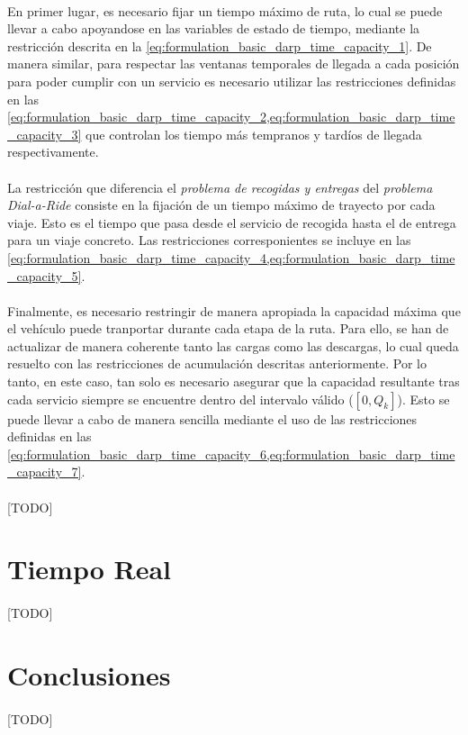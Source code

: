 \documentclass{subfiles}
\begin{document}
        \paragraph{}
        En primer lugar, es necesario fijar un  tiempo máximo de ruta, lo cual se puede llevar a cabo apoyandose en las variables de estado de tiempo, mediante la restricción descrita en la \cref{eq:formulation_basic_darp_time_capacity_1}. De manera similar, para respectar las ventanas temporales de llegada a cada posición para poder cumplir con un servicio es necesario utilizar las restricciones definidas en las \cref{eq:formulation_basic_darp_time_capacity_2,eq:formulation_basic_darp_time_capacity_3} que controlan los tiempo más tempranos y tardíos de llegada respectivamente.

        \paragraph{}
        La restricción que diferencia el \emph{problema de recogidas y entregas} del \emph{problema Dial-a-Ride} consiste en la fijación de un tiempo máximo de trayecto por cada viaje. Esto es el tiempo que pasa desde el servicio de recogida hasta el de entrega para un viaje concreto. Las restricciones corresponientes se incluye en las \cref{eq:formulation_basic_darp_time_capacity_4,eq:formulation_basic_darp_time_capacity_5}.

        \paragraph{}
        Finalmente, es necesario restringir de manera apropiada la capacidad máxima que el vehículo puede tranportar durante cada etapa de la ruta. Para ello, se han de actualizar de manera coherente tanto las cargas como las descargas, lo cual queda resuelto con las restricciones de acumulación descritas anteriormente. Por lo tanto, en este caso, tan solo es necesario asegurar que la capacidad resultante tras cada servicio siempre se encuentre dentro del intervalo válido ($[0, Q_{k}]$). Esto se puede llevar a cabo de manera sencilla mediante el uso de las restricciones definidas en las \cref{eq:formulation_basic_darp_time_capacity_6,eq:formulation_basic_darp_time_capacity_7}.

      \paragraph{}
      [TODO]

    \section{Tiempo Real}
    \label{sec:formulation_real_time}

      \paragraph{}
      [TODO]

    \section{Conclusiones}
    \label{sec:formulation_conclusions}

      \paragraph{}
      [TODO]
\end{document}
